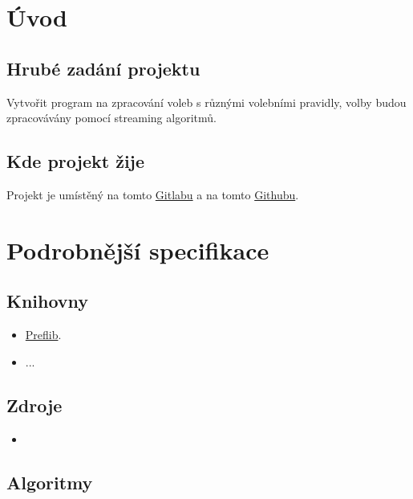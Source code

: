 \documentclass[a4paper,12pt]{report}
\begin{document}
	\pagestyle{toc}
	\tableofcontents
	\cleardoublepage
	\pagestyle{plain}
	\pagebreak
	
	\chapter{Úvod}
	
	\section{Hrubé zadání projektu}
	
	Vytvořit program na zpracování voleb s různými volebními pravidly, volby budou zpracovávány pomocí streaming algoritmů.
	
	\section{Kde projekt žije}
	
	Projekt je umístěný na tomto \href{https://gitlab.com/adam_b3n3s/vote_streams}{Gitlabu} a na tomto \href{https://github.com/AdamBenes3/vote_streams}{Githubu}.
	
	\chapter{Podrobnější specifikace}
	
	\section{Knihovny}
	
	\begin{itemize}
		\item \href{https://github.com/PrefLib}{Preflib}.
		\item ...
	\end{itemize}
	
	\section{Zdroje}
	
	\begin{itemize}
		\item 
	\end{itemize}
	
	\section{Algoritmy}
	
\end{document}
